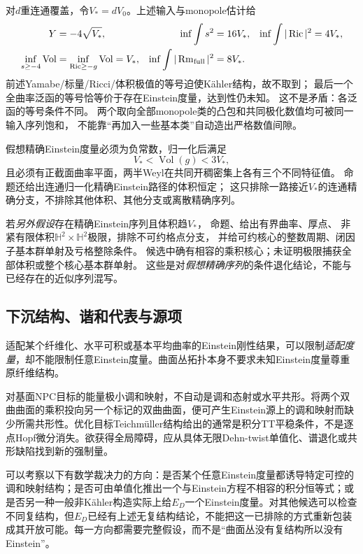 \documentclass[UTF8,a4paper,11pt,fontset=fandol]{ctexart}
\numberwithin{equation}{section}
\theoremstyle{definition}
\newcommand{\Ric}{\operatorname{Ric}}
\newcommand{\Rm}{\operatorname{Rm}}
\newcommand{\Vol}{\operatorname{Vol}}
\begin{document}
对$d$重连通覆盖，令$V_*=dV_0$。上述输入与monopole估计给
\begin{align}
 Y&=-4\sqrt{V_*},&
 \inf\int s^2&=16V_*,&\inf\int|\Ric|^2&=4V_*,\notag\\
 \inf_{s\ge-4}\Vol&=\inf_{\Ric\ge-g}\Vol=V_*,&
 \inf\int|\Rm_{\rm full}|^2&=8V_* .\label{eq:bundlefunctionals}
\end{align}
前述Yamabe/标量/Ricci/体积极值的等号迫使Kähler结构，故不取到；
最后一个全曲率泛函的等号恰等价于存在Einstein度量，达到性仍未知。
这不是矛盾：各泛函的等号条件不同。
两个取向全部monopole类的凸包和共同极化数值均可被同一输入序列饱和，
不能靠“再加入一些基本类”自动造出严格数值间隙。

假想精确Einstein度量必须为负常数，归一化后满足
\[
 V_*<\Vol(g)<3V_*,
\]
且必须有正截面曲率平面，两半Weyl在共同开稠密集上各有三个不同特征值。
命题还给出连通归一化精确Einstein路径的体积恒定；
这只排除一路接近$V_*$的连通精确分支，不排除其他体积、其他分支或离散精确序列。

若\emph{另外假设}存在精确Einstein序列且体积趋$V_*$，
命题、给出有界曲率、厚点、
非紧有限体积$\mathbb H^2\times\mathbb H^2$极限，排除不可约格点分支，
并给可约核心的整数周期、闭因子基本群单射及亏格整除条件。
候选中确有相容的乘积核心；未证明极限捕获全部体积或整个核心基本群单射。
这些是对\emph{假想精确序列}的条件退化结论，不能与已经存在的近似序列混写。

\subsection{下沉结构、谐和代表与源项}

适配某个纤维化、水平可积或基本平均曲率的Einstein刚性结果，可以限制\emph{适配度量}，却不能限制任意Einstein度量。曲面丛拓扑本身不要求未知Einstein度量尊重原纤维结构。

对基面NPC目标的能量极小调和映射，不自动是调和态射或水平共形。将两个双曲曲面的乘积投向另一个标记的双曲曲面，便可产生Einstein源上的调和映射而缺少所需共形性。优化目标Teichm\"uller结构给出的通常是积分TT平稳条件，不是逐点Hopf微分消失。欲获得全局障碍，应从具体无限Dehn-twist单值化、谱退化或共形缺陷找到新的强制量。

可以考察以下有数学裁决力的方向：是否某个任意Einstein度量都诱导特定可控的调和映射结构；是否可由单值化推出一个与Einstein方程不相容的积分恒等式；或是否另一种一般非Kähler构造实际上给$E_D$一个Einstein度量。对其他候选可以检查不同复结构，但$E_D$已经有上述无复结构结论，不能把这一已排除的方式重新包装成其开放可能。每一方向都需要完整假设，而不是“曲面丛没有复结构所以没有Einstein”。
\end{document}
